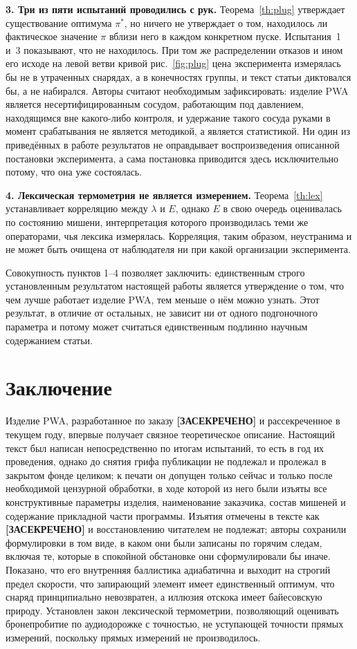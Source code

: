 \documentclass[11pt,a4paper]{article}
\newcommand{\SEC}{\textbf{[ЗАСЕКРЕЧЕНО]}}
\begin{document}
\textbf{3. Три из пяти испытаний проводились с рук.} Теорема~\ref{th:plug} утверждает существование оптимума $\pi^\ast$, но ничего не утверждает о том, находилось ли фактическое значение $\pi$ вблизи него в каждом конкретном пуске. Испытания~1 и~3 показывают, что не находилось. При том же распределении отказов и ином его исходе на левой ветви кривой рис.~\ref{fig:plug} цена эксперимента измерялась бы не в утраченных снарядах, а в конечностях группы, и текст статьи диктовался бы, а не набирался. Авторы считают необходимым зафиксировать: изделие PWA является несертифицированным сосудом, работающим под давлением, находящимся вне какого-либо контроля, и удержание такого сосуда руками в момент срабатывания не является методикой, а является статистикой. Ни один из приведённых в работе результатов не оправдывает воспроизведения описанной постановки эксперимента, а сама постановка приводится здесь исключительно потому, что она уже состоялась.

\textbf{4. Лексическая термометрия не является измерением.} Теорема~\ref{th:lex} устанавливает корреляцию между $\lambda$ и $E$, однако $E$ в свою очередь оценивалась по состоянию мишени, интерпретация которого производилась теми же операторами, чья лексика измерялась. Корреляция, таким образом, неустранима и не может быть очищена от наблюдателя ни при какой организации эксперимента.

Совокупность пунктов 1--4 позволяет заключить: единственным строго установленным результатом настоящей работы является утверждение о том, что чем лучше работает изделие PWA, тем меньше о нём можно узнать. Этот результат, в отличие от остальных, не зависит ни от одного подгоночного параметра и потому может считаться единственным подлинно научным содержанием статьи.

\section{Заключение}

Изделие PWA, разработанное по заказу \SEC{} и рассекреченное в текущем году, впервые получает связное теоретическое описание. Настоящий текст был написан непосредственно по итогам испытаний, то есть в год их проведения, однако до снятия грифа публикации не подлежал и пролежал в закрытом фонде целиком; к печати он допущен только сейчас и только после необходимой цензурной обработки, в ходе которой из него были изъяты все конструктивные параметры изделия, наименование заказчика, состав мишеней и содержание прикладной части программы. Изъятия отмечены в тексте как \SEC{} и восстановлению читателем не подлежат; авторы сохранили формулировки в том виде, в каком они были записаны по горячим следам, включая те, которые в спокойной обстановке они сформулировали бы иначе. Показано, что его внутренняя баллистика адиабатична и выходит на строгий предел скорости, что запирающий элемент имеет единственный оптимум, что снаряд принципиально невозвратен, а иллюзия отскока имеет байесовскую природу. Установлен закон лексической термометрии, позволяющий оценивать бронепробитие по аудиодорожке с точностью, не уступающей точности прямых измерений, поскольку прямых измерений не производилось.
\end{document}
